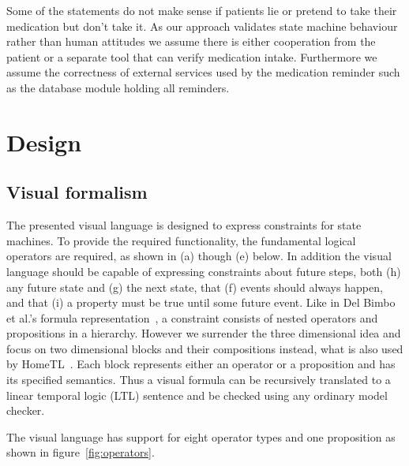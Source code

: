 \documentclass[conference]{IEEEtran}
\begin{document}
Some of the statements do not make sense if patients lie or pretend to take their medication but don't take it. As our approach validates state machine behaviour rather than human attitudes we assume there is either cooperation from the patient or a separate tool that can verify medication intake. Furthermore we assume the correctness of external services used by the medication reminder such as the database module holding all reminders.



\section{Design}

\subsection{Visual formalism}
\label{sec:visualformalism}

The presented visual language is designed to express constraints for state machines. To provide the required functionality, the fundamental logical operators are required, as shown in (a) though (e) below. In addition the visual language should be capable of expressing constraints about future steps, both (h) any future state and (g) the next state, that (f) events should always happen, and that (i) a property must be true until some future event. Like in Del Bimbo et al.'s formula representation~\cite{520786}, a constraint consists of nested operators and propositions in a hierarchy. However we surrender the three dimensional idea and focus on two dimensional blocks and their compositions instead, what is also used by HomeTL~\cite{4341725}.
Each block represents either an operator or a proposition and has its specified semantics. Thus a visual formula can be recursively translated to a linear temporal logic (LTL) sentence and be checked using any ordinary model checker. 

The visual language has support for eight operator types and one proposition as shown in figure~\ref{fig:operators}. 
\end{document}
